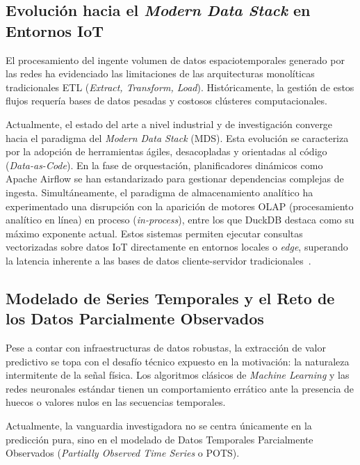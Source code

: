 \subsection{Evolución hacia el \textit{Modern Data Stack} en Entornos IoT}
\label{subsec:estado_data_stack}

El procesamiento del ingente volumen de datos espaciotemporales generado por las redes ha evidenciado las limitaciones de las arquitecturas monolíticas tradicionales ETL (\textit{Extract, Transform, Load}). Históricamente, la gestión de estos flujos requería bases de datos pesadas y costosos clústeres computacionales.

Actualmente, el estado del arte a nivel industrial y de investigación converge hacia el paradigma del \textit{Modern Data Stack} (MDS). Esta evolución se caracteriza por la adopción de herramientas ágiles, desacopladas y orientadas al código (\textit{Data-as-Code}). En la fase de orquestación, planificadores dinámicos como Apache Airflow se han estandarizado para gestionar dependencias complejas de ingesta. Simultáneamente, el paradigma de almacenamiento analítico ha experimentado una disrupción con la aparición de motores OLAP (procesamiento analítico en línea) en proceso (\textit{in-process}), entre los que DuckDB destaca como su máximo exponente actual. Estos sistemas permiten ejecutar consultas vectorizadas sobre datos IoT directamente en entornos locales o \textit{edge}, superando la latencia inherente a las bases de datos cliente-servidor tradicionales~\cite{raasveldt2019duckdb}.

\subsection{Modelado de Series Temporales y el Reto de los Datos Parcialmente Observados}
\label{subsec:estado_imputacion}

Pese a contar con infraestructuras de datos robustas, la extracción de valor predictivo se topa con el desafío técnico expuesto en la motivación: la naturaleza intermitente de la señal física. Los algoritmos clásicos de \textit{Machine Learning} y las redes neuronales estándar tienen un comportamiento errático ante la presencia de huecos o valores nulos en las secuencias temporales.

Actualmente, la vanguardia investigadora no se centra únicamente en la predicción pura, sino en el modelado de Datos Temporales Parcialmente Observados (\textit{Partially Observed Time Series} o POTS).

